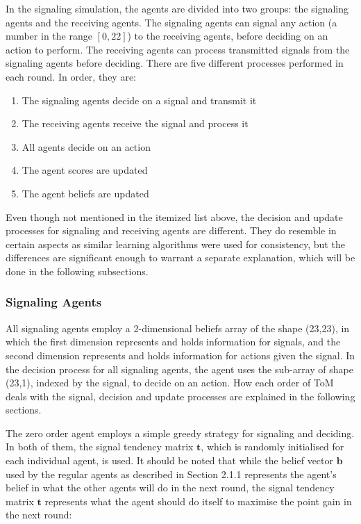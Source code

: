 In the signaling simulation, the agents are divided into two groups: the signaling agents and the receiving agents. The signaling agents can signal any action (a number in the range $[0,22]$) to the receiving agents, before deciding on an action to perform. The receiving agents can process transmitted signals from the signaling agents before deciding. There are five different processes performed in each round. In order, they are:

\begin{enumerate}
    \item The signaling agents decide on a signal and transmit it
    \item The receiving agents receive the signal and process it
    \item All agents decide on an action
    \item The agent scores are updated  
    \item The agent beliefs are updated
\end{enumerate}

Even though not mentioned in the itemized list above, the decision and update processes for signaling and receiving agents are different. They do resemble in certain aspects as similar learning algorithms were used for consistency, but the differences are significant enough to warrant a separate explanation, which will be done in the following subsections.

\subsubsection{Signaling Agents}

All signaling agents employ a 2-dimensional beliefs array of the shape (23,23), in which the first dimension represents and holds information for signals, and the second dimension represents and holds information for actions given the signal. In the decision process for all signaling agents, the agent uses the sub-array of shape (23,1), indexed by the signal, to decide on an action. How each order of ToM deals with the signal, decision and update processes are explained in the following sections.


The zero order agent employs a simple greedy strategy for signaling and deciding. In both of them, the signal tendency matrix $\mathbf{t}$, which is randomly initialised for each individual agent, is used. It should be noted that while the belief vector $\mathbf{b}$ used by the regular agents as described in Section 2.1.1 represents the agent's belief in what the other agents will do in the next round, the signal tendency matrix $\mathbf{t}$ represents what the agent should do itself to maximise the point gain in the next round: 

